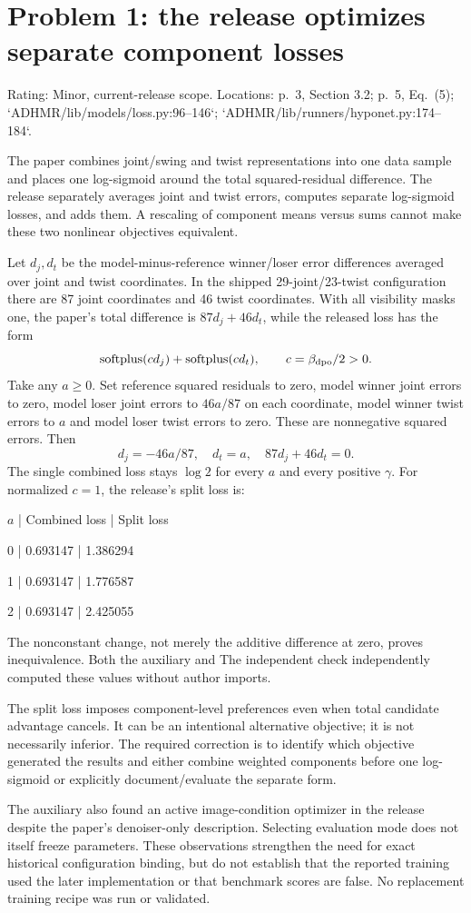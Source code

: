 \documentclass[10pt]{article}
\begin{document}
\section*{Problem 1: the release optimizes separate component losses}
Rating: Minor, current-release scope. Locations: p. 3, Section 3.2; p. 5, Eq. (5); `ADHMR/lib/models/loss.py:96–146`; `ADHMR/lib/runners/hyponet.py:174–184`.\par
The paper combines joint/swing and twist representations into one data sample and places one log-sigmoid around the total squared-residual difference. The release separately averages joint and twist errors, computes separate log-sigmoid losses, and adds them. A rescaling of component means versus sums cannot make these two nonlinear objectives equivalent.\par
Let \(d_j,d_t\) be the model-minus-reference winner/loser error differences averaged over joint and twist coordinates. In the shipped 29-joint/23-twist configuration there are 87 joint coordinates and 46 twist coordinates. With all visibility masks one, the paper’s total difference is \(87d_j+46d_t\), while the released loss has the form \[\operatorname{softplus}(c d_j)+\operatorname{softplus}(c d_t),
 \qquad c=\beta_{\rm dpo}/2>0.\] Take any \(a\ge0\). Set reference squared residuals to zero, model winner joint errors to zero, model loser joint errors to \(46a/87\) on each coordinate, model winner twist errors to \(a\) and model loser twist errors to zero. These are nonnegative squared errors. Then \[d_j=-46a/87,\quad d_t=a,\quad 87d_j+46d_t=0.\] The single combined loss stays \(\log2\) for every \(a\) and every positive \(\gamma\). For normalized \(c=1\), the release’s split loss is:\par
\(a\) | Combined loss | Split loss\par
0 | 0.693147 | 1.386294\par
1 | 0.693147 | 1.776587\par
2 | 0.693147 | 2.425055\par
The nonconstant change, not merely the additive difference at zero, proves inequivalence. Both the auxiliary and The independent check independently computed these values without author imports.\par
The split loss imposes component-level preferences even when total candidate advantage cancels. It can be an intentional alternative objective; it is not necessarily inferior. The required correction is to identify which objective generated the results and either combine weighted components before one log-sigmoid or explicitly document/evaluate the separate form.\par
The auxiliary also found an active image-condition optimizer in the release despite the paper’s denoiser-only description. Selecting evaluation mode does not itself freeze parameters. These observations strengthen the need for exact historical configuration binding, but do not establish that the reported training used the later implementation or that benchmark scores are false. No replacement training recipe was run or validated.\par
\end{document}
